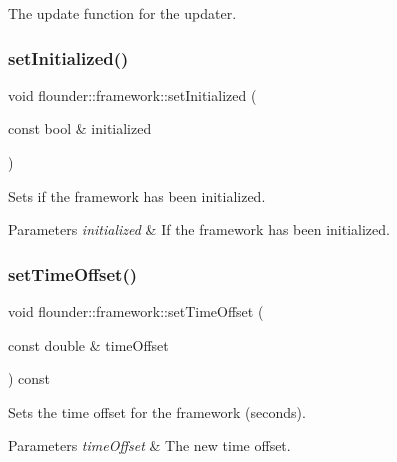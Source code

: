The update function for the updater. 

\mbox{\label{classflounder_1_1framework_a06963c9a669b09c6e33547a6766432df}} 
\subsubsection{\texorpdfstring{set\+Initialized()}{setInitialized()}}
{\footnotesize\ttfamily void flounder\+::framework\+::set\+Initialized (\begin{DoxyParamCaption}\item[{const bool \&}]{initialized }\end{DoxyParamCaption})\hspace{0.3cm}{\ttfamily [inline]}}



Sets if the framework has been initialized. 


\begin{DoxyParams}{Parameters}
{\em initialized} & If the framework has been initialized. \\
\hline
\end{DoxyParams}
\mbox{\label{classflounder_1_1framework_aa4d08f34e622916ecd4a5f5f55bbac88}} 
\subsubsection{\texorpdfstring{set\+Time\+Offset()}{setTimeOffset()}}
{\footnotesize\ttfamily void flounder\+::framework\+::set\+Time\+Offset (\begin{DoxyParamCaption}\item[{const double \&}]{time\+Offset }\end{DoxyParamCaption}) const\hspace{0.3cm}{\ttfamily [inline]}}



Sets the time offset for the framework (seconds). 


\begin{DoxyParams}{Parameters}
{\em time\+Offset} & The new time offset. \\
\hline
\end{DoxyParams}
\mbox{\label{classflounder_1_1framework_abfa2c0da27ab46791ee7877115afffa3}} 
